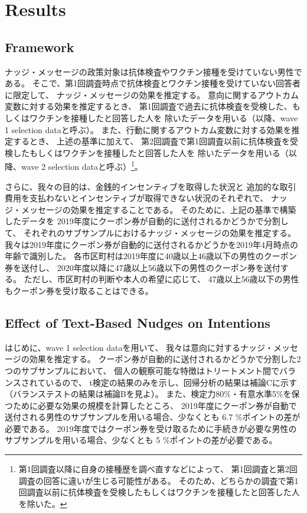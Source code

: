 \documentclass[
  11pt,
  a4paper,
]{article}
\begin{document}
\hypertarget{result}{%
\section{Results}\label{result}}

\hypertarget{framework}{%
\subsection{Framework}\label{framework}}

ナッジ・メッセージの政策対象は抗体検査やワクチン接種を受けていない男性である。
そこで、第1回調査時点で抗体検査とワクチン接種を受けていない回答者に限定して、
ナッジ・メッセージの効果を推定する。
意向に関するアウトカム変数に対する効果を推定するとき、
第1回調査で過去に抗体検査を受検した、もしくはワクチンを接種したと回答した人を
除いたデータを用いる（以降、wave 1 selection dataと呼ぶ）。
また、行動に関するアウトカム変数に対する効果を推定するとき、
上述の基準に加えて、
第2回調査で第1回調査以前に抗体検査を受検したもしくはワクチンを接種したと回答した人を
除いたデータを用いる（以降、wave 2 selection dataと呼ぶ）\footnote{第1回調査以降に自身の接種歴を調べ直すなどによって、
  第1回調査と第2回調査の回答に違いが生じる可能性がある。
  そのため、どちらかの調査で第1回調査以前に抗体検査を受検したもしくはワクチンを接種したと回答した人を除いた。}。

さらに、我々の目的は、金銭的インセンティブを取得した状況と
追加的な取引費用を支払わないとインセンティブが取得できない状況のそれぞれで、
ナッジ・メッセージの効果を推定することである。
そのために、上記の基準で構築したデータを
2019年度にクーポン券が自動的に送付されるかどうかで分割して、
それぞれのサブサンプルにおけるナッジ・メッセージの効果を推定する。
我々は2019年度にクーポン券が自動的に送付されるかどうかを2019年4月時点の年齢で識別した。
各市区町村は2019年度に40歳以上46歳以下の男性のクーポン券を送付し、
2020年度以降に47歳以上56歳以下の男性のクーポン券を送付する。
ただし、市区町村の判断や本人の希望に応じて、
47歳以上56歳以下の男性もクーポン券を受け取ることはできる。

\hypertarget{intention}{%
\subsection{Effect of Text-Based Nudges on Intentions}\label{intention}}

はじめに、wave 1 selection dataを用いて、
我々は意向に対するナッジ・メッセージの効果を推定する。
クーポン券が自動的に送付されるかどうかで分割した2つのサブサンプルにおいて、
個人の観察可能な特徴はトリートメント間でバランスされているので、
t検定の結果のみを示し、回帰分析の結果は補論Cに示す（バランステストの結果は補論Bを見よ）。
また、検定力80\%・有意水準5\%を保つために必要な効果の規模を計算したところ、
2019年度にクーポン券が自動で送付される男性のサブサンプルを用いる場合、少なくとも
6.7
\%ポイントの差が必要である。
2019年度ではクーポン券を受け取るために手続きが必要な男性のサブサンプルを用いる場合、少なくとも
5
\%ポイントの差が必要である。
\end{document}
